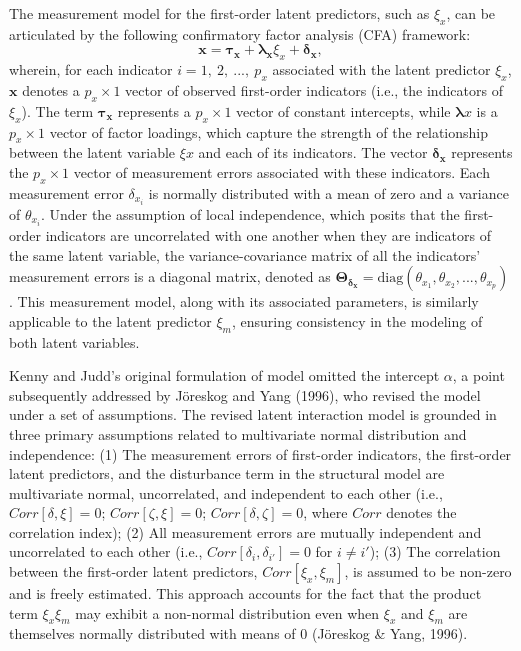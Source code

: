 \documentclass[
  man]{apa6}
\begin{document}
The measurement model for the first-order latent predictors, such as \(\xi_{x}\), can be articulated by the following confirmatory factor analysis (CFA) framework:
\begin{equation}
\mathbf{x} = \boldsymbol{\tau_{x}} + \boldsymbol{\lambda_{x}}\xi_{x} + \boldsymbol{\delta_{x}},
\end{equation}
wherein, for each indicator \(i = 1, \ 2, \ ..., \ p_{x}\) associated with the latent predictor \(\xi_{x}\), \(\mathbf{x}\) denotes a \(p_{x} \times 1\) vector of observed first-order indicators (i.e., the indicators of \(\xi_{x}\)). The term \(\boldsymbol{\tau_{x}}\) represents a \(p_{x} \times 1\) vector of constant intercepts, while \(\boldsymbol{\lambda}{x}\) is a \(p_{x} \times 1\) vector of factor loadings, which capture the strength of the relationship between the latent variable \(\xi{x}\) and each of its indicators. The vector \(\boldsymbol{\delta_{x}}\) represents the \(p_{x} \times 1\) vector of measurement errors associated with these indicators. Each measurement error \(\delta_{x_{i}}\) is normally distributed with a mean of zero and a variance of \(\theta_{x_{i}}\). Under the assumption of local independence, which posits that the first-order indicators are uncorrelated with one another when they are indicators of the same latent variable, the variance-covariance matrix of all the indicators' measurement errors is a diagonal matrix, denoted as \(\mathbf{\Theta_{\delta_{x}}} = \text{diag}(\theta_{x_{1}}, \theta_{x_{2}}, ..., \theta_{x_{p}})\). This measurement model, along with its associated parameters, is similarly applicable to the latent predictor \(\xi_{m}\), ensuring consistency in the modeling of both latent variables.

Kenny and Judd's original formulation of model omitted the intercept \(\alpha\), a point subsequently addressed by Jöreskog and Yang (1996), who revised the model under a set of assumptions. The revised latent interaction model is grounded in three primary assumptions related to multivariate normal distribution and independence: (1) The measurement errors of first-order indicators, the first-order latent predictors, and the disturbance term in the structural model are multivariate normal, uncorrelated, and independent to each other (i.e., \(Corr[\delta, \xi] = 0\); \(Corr[\zeta, \xi] = 0\); \(Corr[\delta, \zeta] = 0\), where \(Corr\) denotes the correlation index); (2) All measurement errors are mutually independent and uncorrelated to each other (i.e., \(Corr[\delta_{i}, \delta_{i'}] = 0\) for \(i \neq i'\)); (3) The correlation between the first-order latent predictors, \(Corr[\xi_{x}, \xi_{m}]\), is assumed to be non-zero and is freely estimated. This approach accounts for the fact that the product term \(\xi_{x}\xi_{m}\) may exhibit a non-normal distribution even when \(\xi_{x}\) and \(\xi_{m}\) are themselves normally distributed with means of 0 (Jöreskog \& Yang, 1996).
\end{document}
